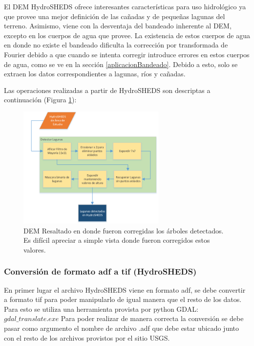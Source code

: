 \documentclass[10pt,a4paper, twoside]{report}
\begin{document}
El DEM HydroSHEDS ofrece interesantes características para uso hidrológico ya que provee una mejor definición de las cañadas y de pequeñas lagunas del terreno. Asimismo, viene con la desventaja del bandeado inherente al DEM, excepto en los cuerpos de agua que provee. La existencia de estos cuerpos de agua en donde no existe el bandeado dificulta la corrección por transformada de Fourier debido a que cuando se intenta corregir introduce errores en estos cuerpos de agua, como se ve en la sección \ref{aplicacionBandeado}. Debido a esto, solo se extraen los datos correspondientes a lagunas, ríos y cañadas.

Las operaciones realizadas a partir de HydroSHEDS son descriptas a continuación (Figura \ref{DiagramaLagunas}):

\begin{figure}[H]
   \centering      
   \includegraphics[width=0.65\textwidth]{imagenes/DiagramaLagunas.pdf}
 \caption{DEM Resaltado en donde fueron corregidas los árboles detectados. Es difícil apreciar a simple vista donde fueron corregidos estos valores.}
 \label{DiagramaLagunas}
\end{figure}

\subsubsection{Conversión de formato adf a tif (HydroSHEDS)}

En primer lugar el archivo HydroSHEDS viene en formato adf, se debe convertir a formato tif para poder manipularlo de igual manera que el resto de los datos. Para esto se utiliza una herramienta provista por python GDAL: $gdal\_translate.exe$
Para poder realizar de manera correcta la conversión se debe pasar como argumento el nombre de archivo .adf que debe estar ubicado junto con el resto de los archivos provistos por el sitio USGS.
\end{document}
